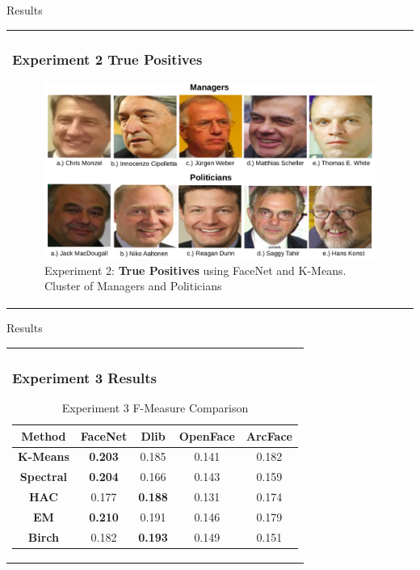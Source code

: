 \documentclass[11pt]{beamer}
\begin{document}
\begin{frame}{Results}
\begin{tabular}{l}
\parbox{1\linewidth}{
\frametitle{Experiment 2 True Positives}
\begin{figure}[H]
 \centering
    \includegraphics[width=\columnwidth]{figures/manager.png}
    \caption{Experiment 2: \textbf{True Positives} using FaceNet and K-Means. Cluster of Managers and Politicians}
    \label{fig:ex2tp}
\end{figure}

}
\end{tabular}  
\end{frame}

\begin{frame}{Results}
\begin{tabular}{l}
\parbox{1\linewidth}{
\frametitle{Experiment 3 Results}
\begin{table}[H]
\centering
\begin{tabular}{||c c c c c||} 
 \hline
Method & FaceNet & Dlib & OpenFace & ArcFace\\ [0.5ex]
 \hline\hline
 \textbf{K-Means} & \textbf{0.203} & 0.185 & 0.141 & 0.182\\ 
 \hline
  \textbf{Spectral} & \textbf{0.204} & 0.166 & 0.143 & 0.159\\
 \hline
 \textbf{HAC} & 0.177 & \textbf{0.188} & 0.131 & 0.174\\
 \hline
 \textbf{EM} & \textbf{0.210} & 0.191 & 0.146 & 0.179\\
 \hline
 \textbf{Birch} & 0.182 & \textbf{0.193} & 0.149 & 0.151\\
 \hline
\end{tabular}
\caption{Experiment 3 F-Measure Comparison}
\label{table:ex3}
\end{table}
}
\end{tabular}  
\end{frame}
\end{document}

